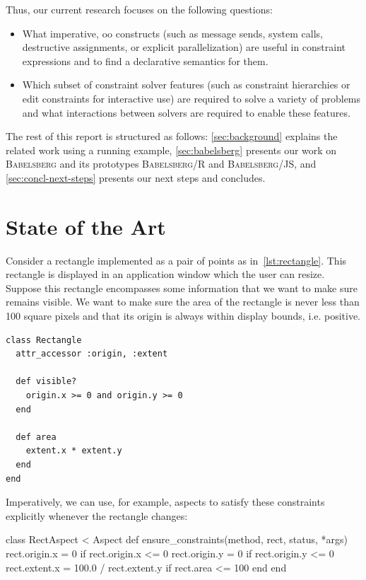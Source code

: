 \documentclass[english, inproceedings]{polze}
\newcommand{\ac}[1]{\gls{#1}}
\newcommand{\langname}{\textsc{Babelsberg}\xspace}
\newcommand{\toolname}{\textsc{Babelsberg/R}\xspace}
\newcommand{\jstoolname}{\textsc{Babelsberg/JS}\xspace}
\begin{document}
Thus, our current research focuses on the following questions:
\begin{itemize}
\item What imperative, \ac{oo} constructs (such as message sends,
  system calls, destructive assignments, or explicit parallelization)
  are useful in constraint expressions and to find a declarative
  semantics for them.
\item Which subset of constraint solver features (such as constraint
  hierarchies or edit constraints for interactive use) are required to
  solve a variety of problems and what interactions between solvers
  are required to enable these features.
\end{itemize}

The rest of this report is structured as follows:
\autoref{sec:background} explains the related work using a running
example, \autoref{sec:babelsberg} presents our work on \langname and
its prototypes \toolname and \jstoolname, and
\autoref{sec:concl-next-steps} presents our next steps and concludes.

\section{State of the Art}
\label{sec:background}

Consider a rectangle implemented as a pair of points as
in~\autoref{lst:rectangle}. This rectangle is displayed in an
application window which the user can resize. Suppose this rectangle
encompasses some information that we want to make sure remains
visible. We want to make sure the area of the rectangle is never less
than 100 square pixels and that its origin is always within display
bounds, i.e. positive.

\begin{lstlisting}[caption={A rectangle implemented as a pair of
    points, with a predicate to test it starts within display bounds
    and a method to calculate the area},
  label={lst:rectangle},
  captionpos=b]
class Rectangle
  attr_accessor :origin, :extent

  def visible?
    origin.x >= 0 and origin.y >= 0
  end

  def area
    extent.x * extent.y
  end
end
\end{lstlisting}

Imperatively, we can use, for example, aspects to satisfy these
constraints explicitly whenever the rectangle changes:
\begin{code}
class RectAspect < Aspect
  def ensure_constraints(method, rect, status, *args)
    rect.origin.x = 0 if rect.origin.x <= 0
    rect.origin.y = 0 if rect.origin.y <= 0
    rect.extent.x = 100.0 / rect.extent.y if rect.area <= 100
  end
end
\end{code}
\end{document}
